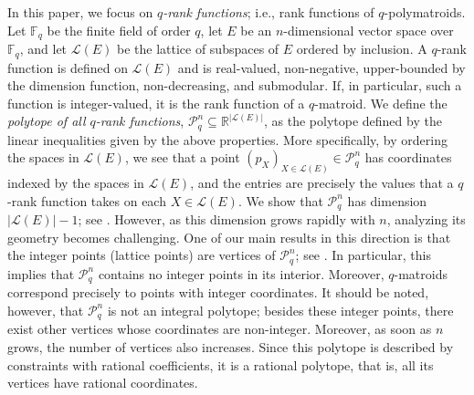 \documentclass[a4paper,11pt,reqno]{amsart}
\theoremstyle{definition}
\newcommand{\mL}{\mathcal{L}}
\begin{document}
In this paper, we focus on \emph{$q$-rank functions}; i.e., rank functions of $q$-polymatroids. Let $\mathbb{F}_q$ be the finite field of order $q$, let $E$ be an $n$-dimensional vector space over $\mathbb{F}_q$, and let $\mathcal{L}(E)$ be the lattice of subspaces of $E$ ordered by inclusion. A $q$-rank function is defined on $\mathcal{L}(E)$ and is real-valued, non-negative, upper-bounded by the dimension function, non-decreasing, and submodular. If, in particular, such a function is integer-valued, it is the rank function of a $q$-matroid. We define the \emph{polytope of all $q$-rank functions}, $\mathcal{P}_q^n \subseteq \mathbb{R}^{|\mathcal{L}(E)|}$, as the polytope defined by the linear inequalities given by the above properties. More specifically, by ordering the spaces in $\mathcal{L}(E)$, we see that a point $(p_X)_{X \in \mathcal{L}(E)} \in \mathcal{P}_q^n$ has coordinates indexed by the spaces in $\mathcal{L}(E)$, and the entries are precisely the values that a $q$-rank function takes on each $X \in \mathcal{L}(E)$.
We show that $\mathcal{P}_q^n$ has dimension $|\mL(E)| - 1$; see . However, as this dimension grows rapidly with $n$, analyzing its geometry becomes challenging. One of our main results in this direction is that the integer points (lattice points) are vertices of $\mathcal{P}_q^n$; see . 
In particular, this implies that $\mathcal{P}_q^n$ contains no integer points in its interior. Moreover, $q$-matroids correspond precisely to points with integer coordinates. It should be noted, however, that $\mathcal{P}_q^n$ is not an integral polytope; besides these integer points, there exist other vertices whose coordinates are non-integer. Moreover, as soon as $n$ grows, the number of vertices also increases. Since this polytope is described by constraints with rational coefficients, it is a rational polytope, that is, all its vertices have rational coordinates. 
\end{document}
